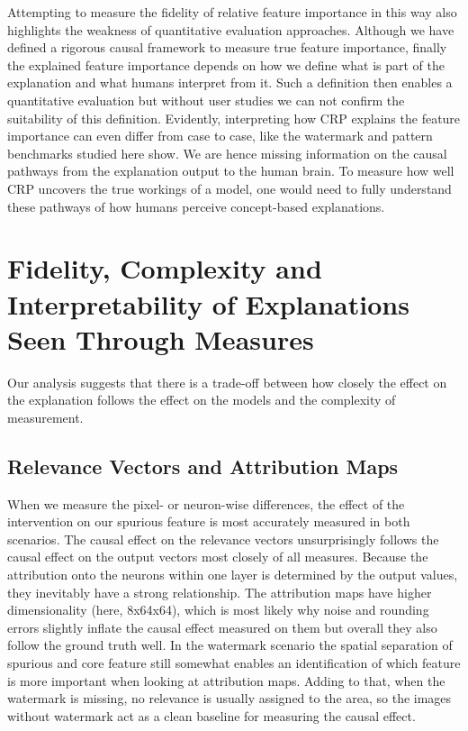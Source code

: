 Attempting to measure the fidelity of relative feature importance in this way also highlights the weakness of quantitative evaluation approaches. 
Although we have defined a rigorous causal framework to 
measure true feature importance, finally the explained feature importance depends on how we define what is part of the explanation and what humans interpret from it. Such a definition then enables a quantitative evaluation but without user studies we can not confirm the suitability of this definition. Evidently, interpreting how CRP explains the feature importance can even differ from case to case, like the watermark and pattern benchmarks studied here show. 
We are hence missing information on the causal pathways from the explanation output to the human brain. To measure how well CRP uncovers the true workings of a model, one would need to fully understand these pathways of how humans perceive concept-based explanations.

\section{Fidelity, Complexity and Interpretability of Explanations Seen Through Measures}
Our analysis suggests that there is a trade-off between how closely the effect on the explanation follows the effect on the models and the complexity of measurement. 

\subsection{Relevance Vectors and Attribution Maps}
When we measure the pixel- or neuron-wise differences, the effect of the intervention on our spurious feature is most accurately measured in both scenarios. 
The causal effect on the relevance vectors unsurprisingly follows the causal effect on the output vectors most closely of all measures. Because the attribution onto the neurons within one layer is determined by the output values, they inevitably have a strong relationship. The attribution maps  have higher dimensionality (here, 8x64x64), which is most likely why noise and rounding errors slightly inflate the causal effect measured on them but overall they also follow the ground truth well.   
In the watermark scenario the spatial separation of spurious and core feature still somewhat enables an identification of which feature is more important when looking at attribution maps. Adding to that, when the watermark is missing, no relevance is usually assigned to the area, so the images without watermark act as a clean baseline for measuring the causal effect. 

